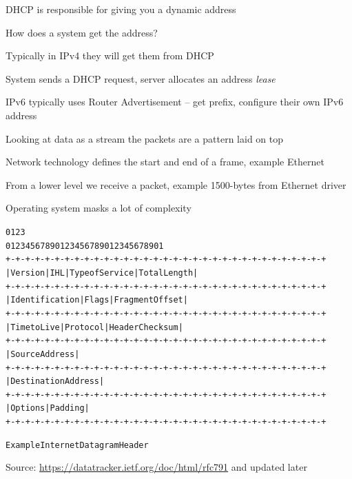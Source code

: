 \documentclass[Screen16to9,17pt]{foils}
\begin{document}


DHCP is responsible for giving you a dynamic address
\begin{list1}
\item How does a system get the address?
\item Typically in  IPv4 they will get them from DHCP
\item System sends a DHCP request, server allocates an address \emph{lease}
\item IPv6 typically uses Router Advertisement -- get prefix, configure their own IPv6 address
\end{list1}



\begin{list1}
\item Looking at data as a stream the packets are a pattern laid on top
\item Network technology defines the start and end of a frame, example Ethernet
\item From a lower level we receive a packet, example 1500-bytes from Ethernet driver
\item Operating system masks a lot of complexity
\end{list1}








\begin{alltt}\footnotesize
    0                   1                   2                   3
    0 1 2 3 4 5 6 7 8 9 0 1 2 3 4 5 6 7 8 9 0 1 2 3 4 5 6 7 8 9 0 1
   +-+-+-+-+-+-+-+-+-+-+-+-+-+-+-+-+-+-+-+-+-+-+-+-+-+-+-+-+-+-+-+-+
   |Version|  IHL  |Type of Service|          Total Length         |
   +-+-+-+-+-+-+-+-+-+-+-+-+-+-+-+-+-+-+-+-+-+-+-+-+-+-+-+-+-+-+-+-+
   |         Identification        |Flags|      Fragment Offset    |
   +-+-+-+-+-+-+-+-+-+-+-+-+-+-+-+-+-+-+-+-+-+-+-+-+-+-+-+-+-+-+-+-+
   |  Time to Live |    Protocol   |         Header Checksum       |
   +-+-+-+-+-+-+-+-+-+-+-+-+-+-+-+-+-+-+-+-+-+-+-+-+-+-+-+-+-+-+-+-+
   |                       Source Address                          |
   +-+-+-+-+-+-+-+-+-+-+-+-+-+-+-+-+-+-+-+-+-+-+-+-+-+-+-+-+-+-+-+-+
   |                    Destination Address                        |
   +-+-+-+-+-+-+-+-+-+-+-+-+-+-+-+-+-+-+-+-+-+-+-+-+-+-+-+-+-+-+-+-+
   |                    Options                    |    Padding    |
   +-+-+-+-+-+-+-+-+-+-+-+-+-+-+-+-+-+-+-+-+-+-+-+-+-+-+-+-+-+-+-+-+

                    Example Internet Datagram Header
\end{alltt}
Source: \url{https://datatracker.ietf.org/doc/html/rfc791} and updated later
\end{document}

